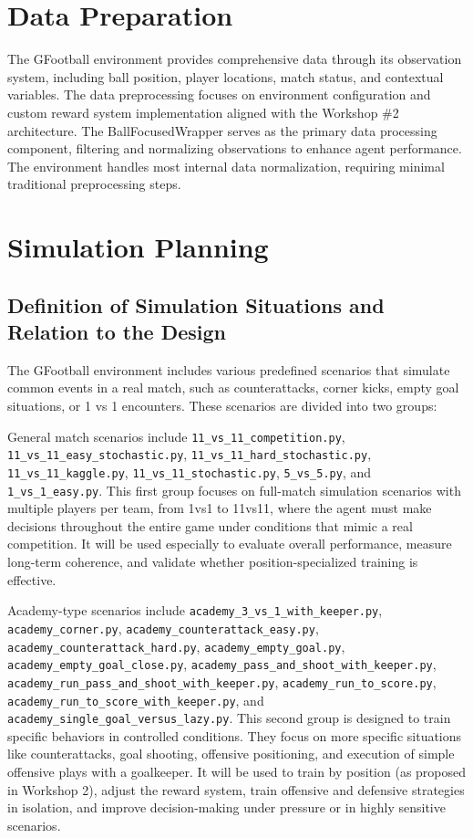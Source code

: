 \documentclass[12pt,a4paper]{article}
\begin{document}
\section{Data Preparation}

The GFootball environment provides comprehensive data through its observation system, including ball position, player locations, match status, and contextual variables. The data preprocessing focuses on environment configuration and custom reward system implementation aligned with the Workshop \#2 architecture. The BallFocusedWrapper serves as the primary data processing component, filtering and normalizing observations to enhance agent performance. The environment handles most internal data normalization, requiring minimal traditional preprocessing steps.

\section{Simulation Planning}

\subsection{Definition of Simulation Situations and Relation to the Design}

The GFootball environment includes various predefined scenarios that simulate common events in a real match, such as counterattacks, corner kicks, empty goal situations, or 1 vs 1 encounters. These scenarios are divided into two groups:

General match scenarios include \texttt{11\_vs\_11\_competition.py}, \texttt{11\_vs\_11\_easy\_stochastic.py}, \texttt{11\_vs\_11\_hard\_stochastic.py}, \texttt{11\_vs\_11\_kaggle.py}, \texttt{11\_vs\_11\_stochastic.py}, \texttt{5\_vs\_5.py}, and \texttt{1\_vs\_1\_easy.py}. This first group focuses on full-match simulation scenarios with multiple players per team, from 1vs1 to 11vs11, where the agent must make decisions throughout the entire game under conditions that mimic a real competition. It will be used especially to evaluate overall performance, measure long-term coherence, and validate whether position-specialized training is effective.

Academy-type scenarios include \texttt{academy\_3\_vs\_1\_with\_keeper.py}, \texttt{academy\_corner.py}, \texttt{academy\_counterattack\_easy.py}, \texttt{academy\_counterattack\_hard.py}, \texttt{academy\_empty\_goal.py}, \texttt{academy\_empty\_goal\_close.py}, \texttt{academy\_pass\_and\_shoot\_with\_keeper.py}, \texttt{academy\_run\_pass\_and\_shoot\_with\_keeper.py}, \texttt{academy\_run\_to\_score.py}, \texttt{academy\_run\_to\_score\_with\_keeper.py}, and \texttt{academy\_single\_goal\_versus\_lazy.py}. This second group is designed to train specific behaviors in controlled conditions. They focus on more specific situations like counterattacks, goal shooting, offensive positioning, and execution of simple offensive plays with a goalkeeper. It will be used to train by position (as proposed in Workshop 2), adjust the reward system, train offensive and defensive strategies in isolation, and improve decision-making under pressure or in highly sensitive scenarios.
\end{document}

